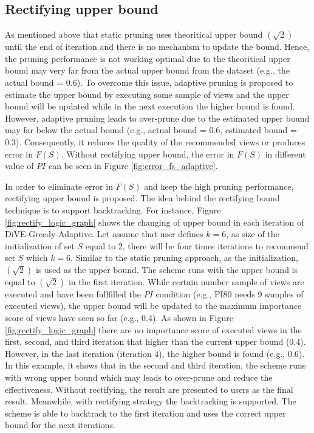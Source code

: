 \documentclass{article}
\begin{document}
\subsection{Rectifying upper bound}
As mentioned above that static pruning uses theoritical upper bound $(\sqrt{2})$ until the end of iteration and there is no mechanism to update the bound. Hence, the pruning performance is not working optimal due to the theoritical upper bound may very far from the actual upper bound from the dataset (e.g., the actual bound = 0.6). To overcome this issue, adaptive pruning is proposed to estimate the upper bound by executing some sample of views and the upper bound will be updated while in the next execution the higher bound is found. However, adaptive pruning leads to over-prune due to the estimated upper bound may far below the actual bound (e.g., actual bound = 0.6, estimated bound = 0.3). Consequently, it reduces the quality of the recommended views or produces error in $F(S)$. Without rectifying upper bound, the error in $F(S)$ in different value of $PI$ can be seen in Figure \ref{fig:error_fs_adaptive}.

In order to eliminate error in $F(S)$ and keep the high pruning performance, rectifying upper bound is proposed. The idea behind the rectifying bound technique is to support backtracking. For instance, Figure \ref{fig:rectify_logic_graph} shows the changing of upper bound in each iteration of DiVE-Greedy-Adaptive. Let assume that user defines $k = 6$, as size of the initialization of set $S$ equal to 2, there will be four times iterations to recommend set $S$ which $k = 6$. Similar to the static pruning approach, as the initialization, $(\sqrt{2})$ is used as the upper bound. The scheme runs with the upper bound is equal to $(\sqrt{2})$ in the first iteration. While certain number sample of views are executed and have been fullfilled the $PI$ condition (e.g., PI80 needs 9 samples of executed views), the upper bound will be updated to the maximum importance score of views have seen so far (e.g., 0.4). As shown in Figure \ref{fig:rectify_logic_graph} there are no importance score of executed views in the first, second, and third iteration that higher than the current upper bound (0.4). However, in the last iteration (iteration 4), the higher bound is found (e.g., 0.6). In this example, it shows that in the second and third iteration, the scheme runs with wrong upper bound which may leads to over-prune and reduce the effectiveness. Without rectifying, the result are presented to users as the final result. Meanwhile, with rectifying strategy the backtracking is supported. The scheme is able to backtrack to the first iteration and uses the correct upper bound for the next iterations. 
\end{document}

